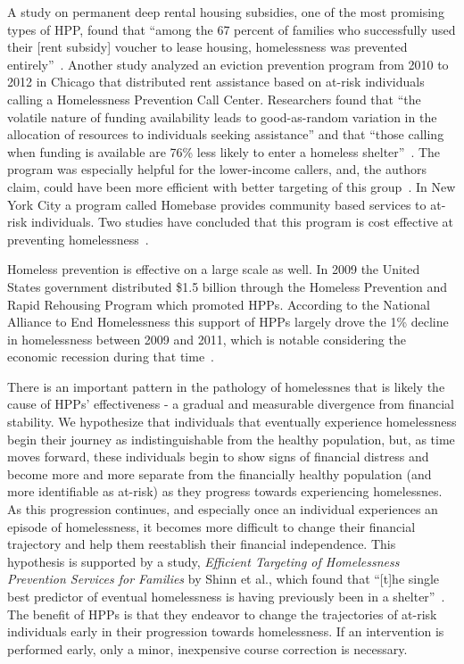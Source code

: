 \documentclass[10pt,letterpaper]{article}
\begin{document}
A study on permanent deep rental housing subsidies, one of the most promising types of HPP, found that ``among the 67 percent of families who successfully used their [rent subsidy] voucher to lease housing, homelessness was prevented entirely''~\cite{shinn2019homelessness}. Another study analyzed an eviction prevention program from 2010 to 2012 in Chicago that distributed rent assistance based on at-risk individuals calling a Homelessness Prevention Call Center. Researchers found that ``the volatile nature of funding availability leads to good-as-random variation in the allocation of resources to individuals seeking assistance'' and that ``those calling when funding is available are 76\% less likely to enter a homeless shelter''~\cite{evans2016impact}. The program was especially helpful for the lower-income callers, and, the authors claim, could have been more efficient with better targeting of this group~\cite{evans2016impact}. In New York City a program called Homebase provides community based services to at-risk individuals. Two studies have concluded that this program is cost effective at preventing homelessness~\cite{rolston2013evaluation, goodman2016homelessness}. 

Homeless prevention is effective on a large scale as well. In 2009 the United States government distributed \$1.5 billion through the Homeless Prevention and Rapid Rehousing Program which promoted HPPs. According to the National Alliance to End Homelessness this support of HPPs largely drove the 1\% decline in homelessness between 2009 and 2011, which is notable considering the economic recession during that time~\cite{shinn2013efficient}.

There is an important pattern in the pathology of homelessnes that is likely the cause of HPPs' effectiveness - a gradual and measurable divergence from financial stability. We hypothesize that individuals that eventually experience homelessness begin their journey as indistinguishable from the healthy population, but, as time moves forward, these individuals begin to show signs of financial distress and become more and more separate from the financially healthy population (and more identifiable as at-risk) as they progress towards experiencing homelessnes. As this progression continues, and especially once an individual experiences an episode of homelessness, it becomes more difficult to change their financial trajectory and help them reestablish their financial independence. This hypothesis is supported by a study, \textit{Efficient Targeting of Homelessness Prevention Services for Families} by Shinn et al., which found that ``[t]he single best predictor of eventual homelessness is having previously been in a shelter''~\cite{shinn2019homelessness}. The benefit of HPPs is that they endeavor to change the trajectories of at-risk individuals early in their progression towards homelessness. If an intervention is performed early, only a minor, inexpensive course correction is necessary. 
\end{document}
